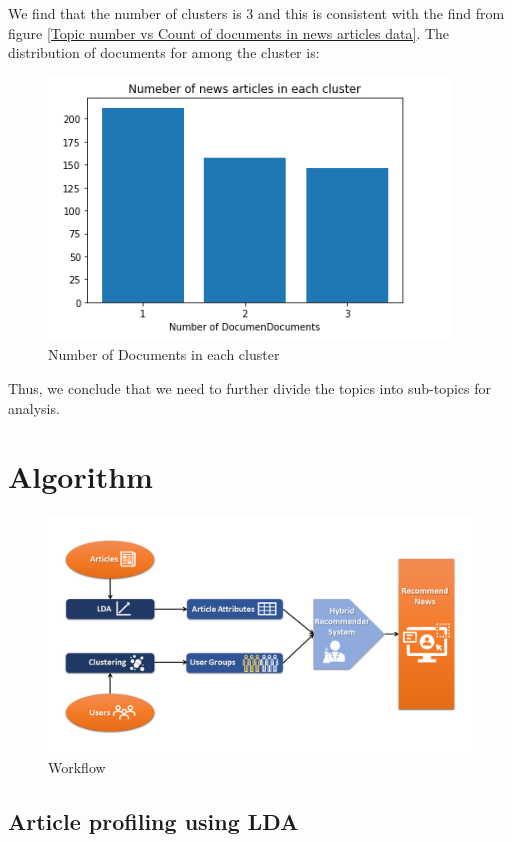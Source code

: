 \documentclass{article}
\begin{document}
We find that the number of clusters is 3 and this is consistent with the find from figure \ref{Topic number vs Count of documents in news articles data}. The distribution of documents for among the cluster  is:
\begin{figure}[H]
    \centering
    \includegraphics{cluster.PNG}
    \caption{Number of Documents in each cluster}
    \label{Number of Documents in each cluster}
\end{figure}



Thus, we conclude that we need to further divide the topics into sub-topics for analysis.


\section{Algorithm}

\begin{figure}
\includegraphics[scale=.40]{NeuRIPS2019/Slide1.PNG}
\caption{Workflow}
\end{figure}

\subsection{Article profiling using LDA}
\end{document}
